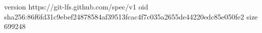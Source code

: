 version https://git-lfs.github.com/spec/v1
oid sha256:86f6fd31c9ebef24878584af39513fcac4f7c035a2655de44220edc85e050fe2
size 699248
